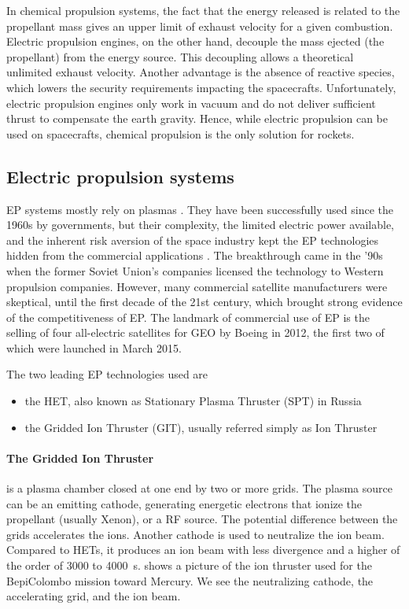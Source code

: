 In chemical propulsion systems, the fact that the energy released is related to the propellant mass gives an upper limit of exhaust velocity for a given combustion.
Electric propulsion engines, on the other hand, decouple the mass ejected (the propellant) from the energy source.
This decoupling allows a theoretical unlimited exhaust velocity.
Another advantage is the absence of reactive species, which lowers the security requirements impacting the spacecrafts.
Unfortunately, electric propulsion engines only work in vacuum and do not deliver sufficient thrust to compensate the earth gravity.
Hence, while electric propulsion can be used on spacecrafts, chemical propulsion is the only solution for rockets.

\subsection{Electric propulsion systems} \label{subsec-EP}
\ac{EP} systems mostly rely on plasmas \citep{charles2009,mazouffre2016}.
They have been successfully used since the 1960s by governments, but their complexity, the limited electric power available, and the inherent risk aversion of the space industry kept the \ac{EP} technologies hidden from the commercial applications \citep{lev2019}.
The breakthrough came in the '90s when the former Soviet Union's companies licensed the technology to Western propulsion companies.
However, many commercial satellite manufacturers were skeptical, until the first decade of the 21st century, which brought strong evidence of the competitiveness of \ac{EP}.
The landmark of commercial use of \ac{EP} is the selling of four all-electric satellites for \ac{GEO} by Boeing in 2012, the first two of which were launched in March 2015.

The two leading \ac{EP} technologies used are
\begin{itemize}
  \item the \ac{HET}, also known as Stationary Plasma Thruster (SPT) in Russia
  \item the Gridded Ion Thruster (GIT), usually referred simply as Ion Thruster
\end{itemize}




 
 \paragraph{The Gridded Ion Thruster} is a plasma chamber closed at one end by two or more grids.
 The plasma source can be an emitting cathode, generating energetic electrons that ionize the propellant (usually Xenon), or a \ac{RF} source.
 The potential difference between the grids accelerates the ions.
 Another cathode is used to neutralize the ion beam.
 Compared to \ac{HET}s, it produces an ion beam with less divergence and a higher \Isp of the order of 3000 to 4000~s.
  shows a picture of the ion thruster used for the BepiColombo mission toward Mercury.
 We see the neutralizing cathode, the accelerating grid, and the ion beam.
 
